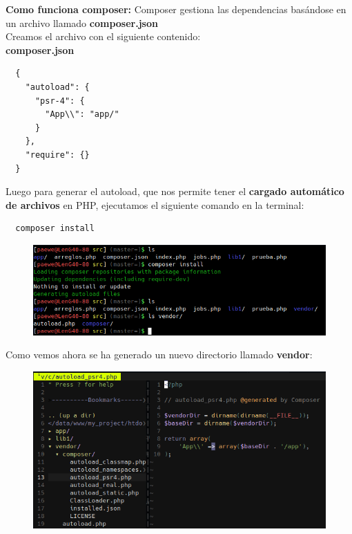 \documentclass{article}
\begin{document}
\textbf{Como funciona composer:} Composer gestiona las dependencias basándose
en un archivo llamado \textbf{composer.json}\\

Creamos el archivo con el siguiente contenido:\\

\textbf{composer.json}
\begin{verbatim}
  {
    "autoload": {
      "psr-4": {
        "App\\": "app/"
      }
    },
    "require": {}
  }
\end{verbatim}

Luego para generar el autoload, que nos permite tener el \textbf{cargado
automático de archivos} en PHP, ejecutamos el siguiente comando en la terminal:

\begin{verbatim}
  composer install
\end{verbatim}

\begin{figure}[h!]
  \centering
  \includegraphics[scale=0.75]{./Pictures/062_vendor.png}
\end{figure}

Como vemos ahora se ha generado un nuevo directorio llamado \textbf{vendor}:\\

\newpage

\begin{figure}[h!]
  \centering
  \includegraphics[scale=0.75]{./Pictures/061_vendor.png}
\end{figure}
\end{document}
